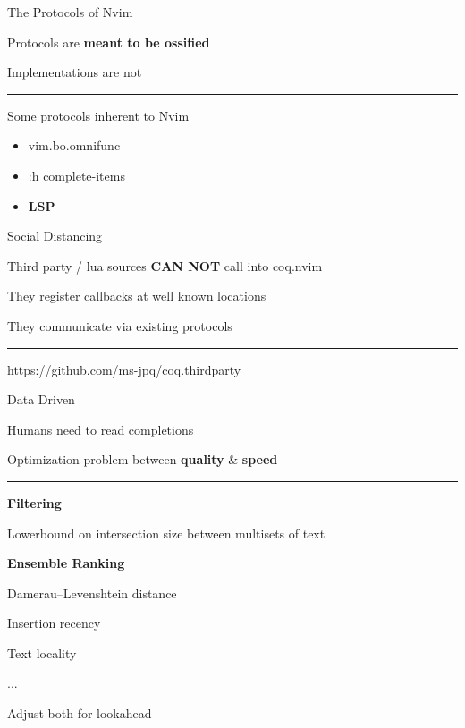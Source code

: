 \documentclass{beamer}
\begin{document}
\begin{frame}{The Protocols of Nvim}

	Protocols are \textbf{meant to be ossified}

	Implementations are not

	\rule{\textwidth}{0.1em}

	Some protocols inherent to Nvim

	\begin{itemize}

		\item vim.bo.omnifunc

		\item :h complete-items

		\item \textbf{LSP}

	\end{itemize}

\end{frame}


\begin{frame}{Social Distancing}

	Third party / lua sources \textbf{CAN NOT} call into coq.nvim

	They register callbacks at well known locations

	They communicate via existing protocols

	\rule{\textwidth}{0.1em}

	https://github.com/ms-jpq/coq.thirdparty

\end{frame}


\begin{frame}{Data Driven}
	
	Humans need to read completions

	Optimization problem between \textbf{quality} \& \textbf{speed}

	\rule{\textwidth}{0.1em}

	\begin{multicols}{2}
 	
		\textbf{Filtering}
  	
		Lowerbound on intersection size between multisets of text

		\columnbreak
		
		\textbf{Ensemble Ranking}
  	
		Damerau–Levenshtein distance

		Insertion recency

		Text locality

		...

	\end{multicols}

	Adjust both for lookahead

\end{frame}
\end{document}
